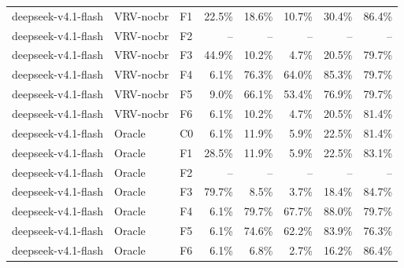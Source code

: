 \begin{tabular}{lllrrrrr}
deepseek-v4.1-flash & VRV-nocbr & F1 & 22.5\% & 18.6\% & 10.7\% & 30.4\% & 86.4\% \\
deepseek-v4.1-flash & VRV-nocbr & F2 & -- & -- & -- & -- & -- \\
deepseek-v4.1-flash & VRV-nocbr & F3 & 44.9\% & 10.2\% & 4.7\% & 20.5\% & 79.7\% \\
deepseek-v4.1-flash & VRV-nocbr & F4 & 6.1\% & 76.3\% & 64.0\% & 85.3\% & 79.7\% \\
deepseek-v4.1-flash & VRV-nocbr & F5 & 9.0\% & 66.1\% & 53.4\% & 76.9\% & 79.7\% \\
deepseek-v4.1-flash & VRV-nocbr & F6 & 6.1\% & 10.2\% & 4.7\% & 20.5\% & 81.4\% \\
deepseek-v4.1-flash & Oracle & C0 & 6.1\% & 11.9\% & 5.9\% & 22.5\% & 81.4\% \\
deepseek-v4.1-flash & Oracle & F1 & 28.5\% & 11.9\% & 5.9\% & 22.5\% & 83.1\% \\
deepseek-v4.1-flash & Oracle & F2 & -- & -- & -- & -- & -- \\
deepseek-v4.1-flash & Oracle & F3 & 79.7\% & 8.5\% & 3.7\% & 18.4\% & 84.7\% \\
deepseek-v4.1-flash & Oracle & F4 & 6.1\% & 79.7\% & 67.7\% & 88.0\% & 79.7\% \\
deepseek-v4.1-flash & Oracle & F5 & 6.1\% & 74.6\% & 62.2\% & 83.9\% & 76.3\% \\
deepseek-v4.1-flash & Oracle & F6 & 6.1\% & 6.8\% & 2.7\% & 16.2\% & 86.4\% \\
\bottomrule
\end{tabular}
